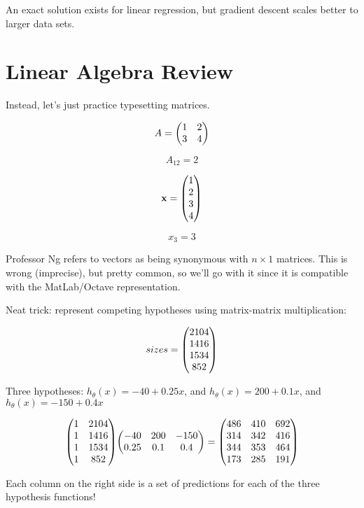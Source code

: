 An exact solution exists for linear regression, but gradient descent scales better to larger data sets.

\section{Linear Algebra Review}

Instead, let's just practice typesetting matrices.

\[ A = \mqty( 1 & 2 \\ 3 & 4 ) \]

\[ A_{12} = 2 \]

\[ \vb{x} = \mqty(1 \\ 2 \\ 3 \\ 4) \]

\[ x_3 = 3 \]

Professor Ng refers to vectors as being synonymous with $n \times 1$ matrices.
This is wrong (imprecise), but pretty common, so we'll go with it since it is 
compatible with the MatLab/Octave representation.

Neat trick: represent competing hypotheses using matrix-matrix multiplication:

\[ sizes = \mqty(2104 \\ 1416 \\ 1534 \\ 852) \]

Three hypotheses: 
$h_{\theta}(x) = -40 + 0.25x$, and 
$h_{\theta}(x) = 200 + 0.1x$, and 
$h_{\theta}(x) = -150 + 0.4x$

\[
  \mqty( 1 & 2104 \\ 1 & 1416 \\ 1 & 1534 \\ 1 & 852 )
  \mqty(-40 & 200 & -150 \\ 0.25 & 0.1 & 0.4)
  =
  \mqty(486 & 410 & 692 \\ 314 & 342 & 416 \\ 344 & 353 & 464 \\ 173 & 285 & 191)
\]

Each column on the right side is a set of predictions for each of the three hypothesis functions!